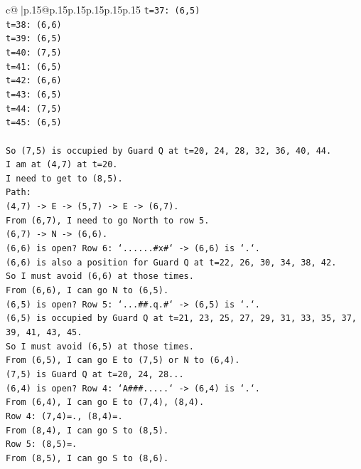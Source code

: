 \documentclass{article}
\begin{document}
{\begin{supertabular}{c@{$\;$}|p{.15\linewidth}@{}p{.15\linewidth}p{.15\linewidth}p{.15\linewidth}p{.15\linewidth}p{.15\linewidth}}
{{{\texttt{t=37: (6,5)} \\
\texttt{t=38: (6,6)} \\
\texttt{t=39: (6,5)} \\
\texttt{t=40: (7,5)} \\
\texttt{t=41: (6,5)} \\
\texttt{t=42: (6,6)} \\
\texttt{t=43: (6,5)} \\
\texttt{t=44: (7,5)} \\
\texttt{t=45: (6,5)} \\
\\ 
\texttt{So (7,5) is occupied by Guard Q at t=20, 24, 28, 32, 36, 40, 44.} \\
\texttt{I am at (4,7) at t=20.} \\
\texttt{I need to get to (8,5).} \\
\texttt{Path:} \\
\texttt{(4,7) {-}> E {-}> (5,7) {-}> E {-}> (6,7).} \\
\texttt{From (6,7), I need to go North to row 5.} \\
\texttt{(6,7) {-}> N {-}> (6,6).} \\
\texttt{(6,6) is open? Row 6: `......\#x\#` {-}> (6,6) is `.`.} \\
\texttt{(6,6) is also a position for Guard Q at t=22, 26, 30, 34, 38, 42.} \\
\texttt{So I must avoid (6,6) at those times.} \\
\texttt{From (6,6), I can go N to (6,5).} \\
\texttt{(6,5) is open? Row 5: `...\#\#.q.\#` {-}> (6,5) is `.`.} \\
\texttt{(6,5) is occupied by Guard Q at t=21, 23, 25, 27, 29, 31, 33, 35, 37, 39, 41, 43, 45.} \\
\texttt{So I must avoid (6,5) at those times.} \\
\texttt{From (6,5), I can go E to (7,5) or N to (6,4).} \\
\texttt{(7,5) is Guard Q at t=20, 24, 28...} \\
\texttt{(6,4) is open? Row 4: `A\#\#\#.....` {-}> (6,4) is `.`.} \\
\texttt{From (6,4), I can go E to (7,4), (8,4).} \\
\texttt{Row 4: (7,4)=., (8,4)=.} \\
\texttt{From (8,4), I can go S to (8,5).} \\
\texttt{Row 5: (8,5)=.} \\
\texttt{From (8,5), I can go S to (8,6).} \\
}}}
\end{supertabular}}
\end{document}
